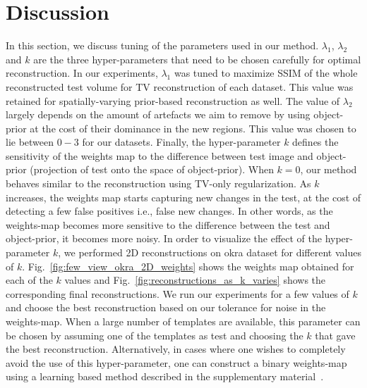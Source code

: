 \documentclass[journal]{IEEEtran}
\begin{document}


\section{Discussion}
\label{sec:discussion}
In this section, we discuss tuning of the parameters
used in our method. $\lambda_1$, $\lambda_2$ and $k$ are the three
hyper-parameters that need to be chosen carefully for optimal
reconstruction. In our experiments, $\lambda_1$ was tuned to maximize
SSIM of the whole reconstructed test volume for TV reconstruction of
each dataset. This value was retained for spatially-varying
prior-based reconstruction as well. The value of $\lambda_2$ largely
depends on the amount of artefacts we aim to remove by using
object-prior at the cost of their dominance in the new regions. This
value was chosen to lie between $0-3$ for our datasets. Finally, the
hyper-parameter $k$ defines the sensitivity of the weights map to the
difference between test image and object-prior (projection of
test onto the space of object-prior). When $k=0$, our method 
behaves similar to the reconstruction using TV-only regularization. As $k$ increases, the weights map starts
capturing new changes in the test, at the cost of detecting a few
false positives i.e., false new changes. In other words, as the
weights-map becomes more sensitive to the difference between the test
and object-prior, it becomes more noisy. In order to visualize the
effect of the hyper-parameter $k$, we performed 2D reconstructions on
okra dataset for different values of
$k$. Fig.~\ref{fig:few_view_okra_2D_weights} shows the weights map
obtained for each of the $k$ values and
Fig.~\ref{fig:reconstructions_as_k_varies} shows the corresponding
final reconstructions. We run our experiments for a few values of $k$
and choose the best reconstruction based on our tolerance for noise
in the weights-map.
When a large number of templates are available, this parameter can be
chosen by assuming one of the templates as test and choosing the $k$
that gave the best reconstruction. Alternatively, in cases where one
wishes to completely avoid the use of this hyper-parameter, one can
construct a binary weights-map using a learning based method described
in the supplementary material~\cite{supp_paper}.

\end{document}
